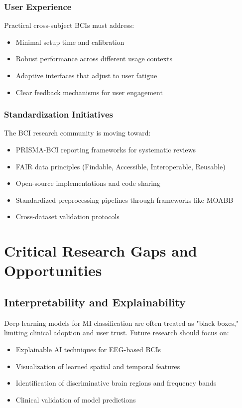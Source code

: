 \documentclass[12pt]{article}
\begin{document}
\subsubsection{User Experience}

Practical cross-subject BCIs must address:
\begin{itemize}
    \item Minimal setup time and calibration
    \item Robust performance across different usage contexts
    \item Adaptive interfaces that adjust to user fatigue
    \item Clear feedback mechanisms for user engagement
\end{itemize}

\subsubsection{Standardization Initiatives}

The BCI research community is moving toward:
\begin{itemize}
    \item PRISMA-BCI reporting frameworks for systematic reviews
    \item FAIR data principles (Findable, Accessible, Interoperable, Reusable)
    \item Open-source implementations and code sharing
    \item Standardized preprocessing pipelines through frameworks like MOABB
    \item Cross-dataset validation protocols
\end{itemize}

\section{Critical Research Gaps and Opportunities}

\subsection{Interpretability and Explainability}

Deep learning models for MI classification are often treated as "black boxes," limiting clinical adoption and user trust. Future research should focus on:
\begin{itemize}
    \item Explainable AI techniques for EEG-based BCIs
    \item Visualization of learned spatial and temporal features
    \item Identification of discriminative brain regions and frequency bands
    \item Clinical validation of model predictions
\end{itemize}
\end{document}
